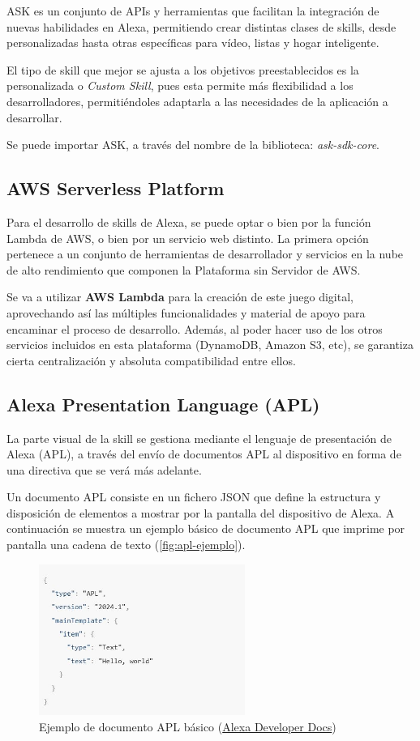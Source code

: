 ASK es un conjunto de APIs y herramientas que facilitan la integración de nuevas habilidades en Alexa, permitiendo crear distintas clases de skills, desde personalizadas hasta otras específicas para vídeo, listas y hogar inteligente.

El tipo de skill que mejor se ajusta a los objetivos preestablecidos es la personalizada o \textit{Custom Skill}, pues esta permite más flexibilidad a los desarrolladores, permitiéndoles adaptarla a las necesidades de la aplicación a desarrollar.

Se puede importar ASK, a través del nombre de la biblioteca: \textit{ask-sdk-core}.

\subsection{AWS Serverless Platform}

Para el desarrollo de skills de Alexa, se puede optar o bien por la función Lambda de AWS, o bien por un servicio web distinto. La primera opción pertenece a un conjunto de herramientas de desarrollador y servicios en la nube de alto rendimiento que componen la Plataforma sin Servidor de AWS.

Se va a utilizar \textbf{AWS Lambda} para la creación de este juego digital, aprovechando así las múltiples funcionalidades y material de apoyo para encaminar el proceso de desarrollo. Además, al poder hacer uso de los otros servicios incluidos en esta plataforma (DynamoDB, Amazon S3, etc), se garantiza cierta centralización y absoluta compatibilidad entre ellos.

\subsection{Alexa Presentation Language (APL)}

La parte visual de la skill se gestiona mediante el lenguaje de presentación de Alexa (APL), a través del envío de documentos APL al dispositivo en forma de una directiva que se verá más adelante.

Un documento APL consiste en un fichero JSON que define la estructura y disposición de elementos a mostrar por la pantalla del dispositivo de Alexa.
A continuación se muestra un ejemplo básico de documento APL que imprime por pantalla una cadena de texto (\autoref{fig:apl-ejemplo}).

\begin{figure}[H]
	\centering
	\includegraphics[width=0.6\textwidth]{imgs/apl-example.JPG}
	\caption{Ejemplo de documento APL básico (\href{https://developer.amazon.com/en-US/docs/alexa/alexa-presentation-language/apl-document.html}{Alexa Developer Docs})}
	\label{fig:apl-ejemplo}
\end{figure}

